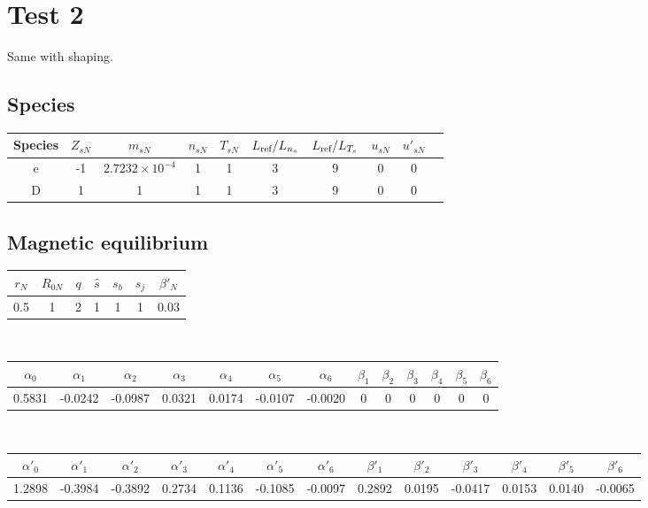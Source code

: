 \documentclass[a4paper]{report}
\begin{document}
\section{Test 2}
Same with shaping.

\subsection{Species}
\begin{tabular}{c c c c c c c c c c}
\hline
Species & $Z_{sN}$ & $m_{sN}$ & $n_{sN}$ & $T_{sN}$ & $L_{\textrm{ref}}/L_{n_s}$ & $L_{\textrm{ref}}/L_{T_s}$ & $u_{sN}$ & $u'_{sN}$ \\ [0.5ex]
\hline
e & -1 & $2.7232\times10^{-4}$ & 1 & 1 & 3 & 9 & 0 & 0 \\ [0.5ex]
\hline 
D &  1 & 1 & 1 & 1 & 3 & 9 & 0 & 0 \\ [0.5ex]
\hline
\end{tabular}

\subsection{Magnetic equilibrium}
\begin{tabular}{c c c c c c c}
\hline
$r_N$ & $R_{0N}$ & $q$ & $\hat{s}$ & $s_b$ & $s_j$ & $\beta'_N$ \\ [0.5ex]
\hline
0.5 & 1 & 2 & 1 & 1 & 1 & 0.03 \\
\hline
\end{tabular}\\
\begin{tabular}{c c c c c c c c c c c c c}
\hline
$\alpha_0$ & $\alpha_1$ & $\alpha_2$ & $\alpha_3$ & $\alpha_4$ & $\alpha_5$ & $\alpha_6$ 
& $\beta_1$ & $\beta_2$ & $\beta_3$ & $\beta_4$ & $\beta_5$ & $\beta_6$   \\ [0.5ex]
\hline
 0.5831 & -0.0242 & -0.0987 & 0.0321 & 0.0174 & -0.0107 & -0.0020 & 0 & 0 & 0 & 0 & 0 & 0 \\
\hline
\end{tabular}\\
\begin{tabular}{c c c c c c c c c c c c c}
\hline
$\alpha'_0$ & $\alpha'_1$ & $\alpha'_2$ & $\alpha'_3$ & $\alpha'_4$ & $\alpha'_5$ & $\alpha'_6$ 
& $\beta'_1$ & $\beta'_2$ & $\beta'_3$ & $\beta'_4$ & $\beta'_5$ & $\beta'_6$   \\ [0.5ex]
\hline
1.2898 & -0.3984 & -0.3892 & 0.2734 & 0.1136 & -0.1085  & -0.0097 & 0.2892 & 0.0195 & -0.0417  & 0.0153 & 0.0140 & -0.0065 \\
\hline
\end{tabular}
\end{document}
